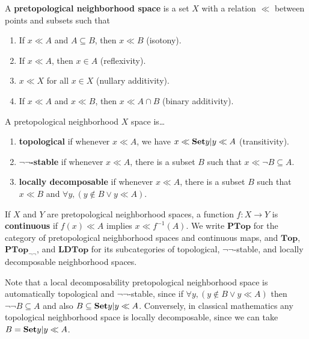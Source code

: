 \documentclass{article}
\def\cpl#1{\neg #1}
\def\inv{^{-1}}
\def\nn{\ensuremath{\neg\neg}}
\def\PTop{\mathbf{PTop}}
\def\Top{\mathbf{Top}}
\def\PTopnn{\mathbf{PTop}_{\nn}}
\def\LDTop{\mathbf{LDTop}}
\begin{document}
\begin{defn}
  A \textbf{pretopological neighborhood space} is a set $X$ with a relation $\ll$ between points and subsets such that
  \begin{enumerate}
  \item If $x\ll A$ and $A\subseteq B$, then $x\ll B$ (isotony).
  \item If $x\ll A$, then $x\in A$ (reflexivity).
  \item $x\ll X$ for all $x\in X$ (nullary additivity).
  \item If $x\ll A$ and $x\ll B$, then $x\ll A\cap B$ (binary additivity).
  \end{enumerate}
  A pretopological neighborhood $X$ space is\dots
  \begin{enumerate}[resume]
  \item \textbf{topological} if whenever $x\ll A$, we have $x \ll \setof{ y | y\ll A}$ (transitivity).
  \item \textbf{\nn-stable} if whenever $x\ll A$, there is a subset $B$ such that $x\ll \cpl{B} \subseteq A$.
  \item \textbf{locally decomposable} if whenever $x\ll A$, there is a subset $B$ such that $x\ll B$ and $\forall y, (y\notin B \lor y \ll A)$.
  \end{enumerate}
  If $X$ and $Y$ are pretopological neighborhood spaces, a function $f:X\to Y$ is \textbf{continuous} if $f(x)\ll A$ implies $x\ll f\inv(A)$.
  We write $\PTop$ for the category of pretopological neighborhood spaces and continuous maps, and $\Top$, $\PTopnn$, and $\LDTop$ for its subcategories of topological, \nn-stable, and locally decomposable neighborhood spaces.
\end{defn}

Note that a local decomposability pretopological neighborhood space is automatically topological and \nn-stable, since if $\forall y, (y\notin B \lor y \ll A)$ then $\neg\neg B \subseteq A$ and also $B \subseteq \setof{ y | y\ll A}$.
Conversely, in classical mathematics any topological neighborhood space is locally decomposable, since we can take $B = \setof{ y | y\ll A}$.
\end{document}
